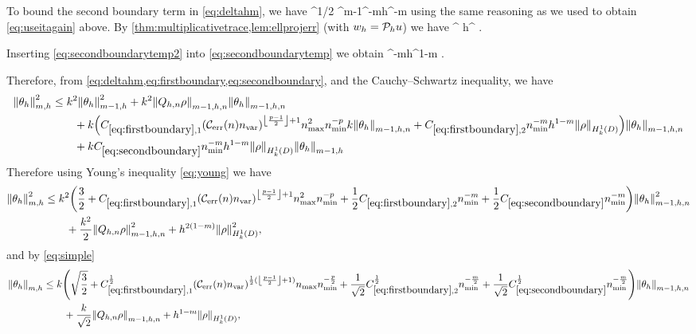 To bound the second boundary term in \cref{eq:deltahm}, we have
\beq\label{eq:secondboundarytemp}
 \leq \CMT \CinvVhp^{1/2} \Chinv^{m-1}\nmin^{-m}h^{\half-m}\NLtGI{\rho}
\eeq
using the same reasoning as we used to obtain \cref{eq:useitagain} above. By \cref{thm:multiplicativetrace,lem:ellprojerr} (with $w_{h} = \mathcal P_{h} u$) we have
\beq\label{eq:secondboundarytemp2}
\NLtGI{\rho} \leq \CMT {}^{\half} h^{\half} \NHokD{\rho}.
\eeq

Inserting \cref{eq:secondboundarytemp2} into \cref{eq:secondboundarytemp} we obtain
\beq\label{eq:secondboundary}
 \leq \CBth \nmin^{-m}h^{1-m} \NHokD{\rho} .
\eeq

Therefore, from\renewcommand{\creflastconjunction}{,~} \cref{eq:deltahm,eq:firstboundary,eq:secondboundary},\renewcommand{\creflastconjunction}{\lastconj} and the Cauchy--Schwartz inequality, we have
\begin{align*}
\Nfn{m,h}{\thetah}^2 &\leq k^2 \Nfn{m-1,h}{\thetah}^2 + k^2 \Nfn{m-1,h,n}{\Qhn \rho}\Nfn{m-1,h,n}{\thetah}\nonumber\\
&\quad\quad+ k\mleft(\CBo \mleft(\En\nvar\mright)^{\floor{\frac{p-1}2}+1}\nmax^2\nmin^{-p}k \Nfn{m-1,h,n}{\thetah} + \CBt \nmin^{-m}h^{1-m} \NHokD{\rho}\mright)\Nfn{m-1,h,n}{\thetah}\nonumber\\
&\quad\quad+ k\CBth \nmin^{-m}h^{1-m} \NHokD{\rho} \Nfn{m-1,h}{\thetah}%
\end{align*}
Therefore using Young's inequality \cref{eq:young} we have
\begin{align*}
\Nfn{m,h}{\thetah}^2 &\leq k^2\mleft(\frac32 + \CBo \mleft(\En\nvar\mright)^{\floor{\frac{p-1}2}+1}\nmax^2\nmin^{-p} + \half \CBt \nmin^{-m} + \half\CBth \nmin^{-m}\mright)\Nfn{m-1,h,n}{\thetah}^2\\
&\quad\quad+ \frac{k^2}2 \Nfn{m-1,h,n}{\Qhn \rho}^2 +  h^{2(1-m)} \NHokD{\rho}^2,
\end{align*}
and by \cref{eq:simple}
\begin{align}
\Nfn{m,h}{\thetah} &\leq k\mleft(\sqrt{\frac32} + \CBo^{\half} \mleft(\En\nvar\mright)^{\half(\floor{\frac{p-1}2}+1)}\nmax\nmin^{-\frac{p}2} + \frac1{\sqrt{2}} \CBt^{\half} \nmin^{-\frac{m}2} + \frac1{\sqrt{2}}\CBth^{\half} \nmin^{-\frac{m}2}\mright)\Nfn{m-1,h,n}{\thetah}\nonumber\\
&\quad\quad+ \frac{k}{\sqrt{2}} \Nfn{m-1,h,n}{\Qhn \rho} +  h^{1-m} \NHokD{\rho},\label{eq:thetahighnearly}
\end{align}


